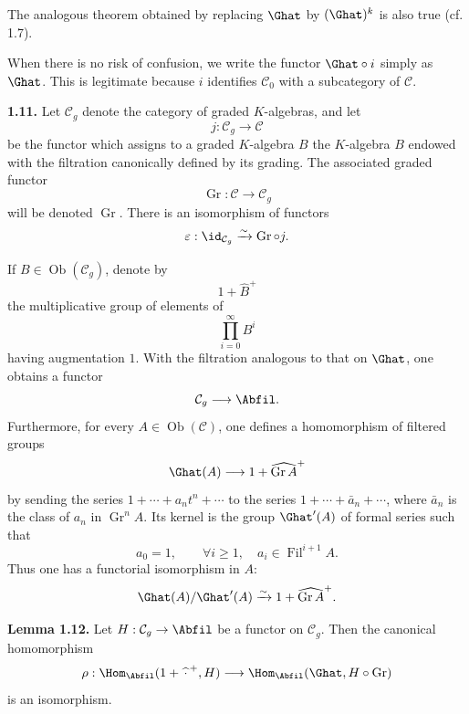 \documentclass[11pt]{article}
\newcommand{\Fil}{\operatorname{Fil}}
\begin{document}
The analogous theorem obtained by replacing \(\Ghat\) by \((\Ghat)^k\) is also true (cf. 1.7).

When there is no risk of confusion, we write the functor \(\Ghat\circ i\) simply as \(\Ghat\). This is legitimate because \(i\) identifies \(\mathcal C_0\) with a subcategory of \(\mathcal C\).

\textbf{1.11.} Let \(\mathcal C_g\) denote the category of graded \(K\)-algebras, and let
\[
  j:\mathcal C_g\longrightarrow\mathcal C
\]
be the functor which assigns to a graded \(K\)-algebra \(B\) the \(K\)-algebra \(B\) endowed with the filtration canonically defined by its grading. The associated graded functor
\[
  \operatorname{Gr}:\mathcal C\longrightarrow \mathcal C_g
\]
will be denoted \(\operatorname{Gr}\). There is an isomorphism of functors
\[
  \varepsilon:\id_{\mathcal C_g}\xrightarrow{\sim}\operatorname{Gr}\circ j.
\]

If \(B\in\operatorname{Ob}(\mathcal C_g)\), denote by
\[
  1+\widehat{B}^{+}
\]
the multiplicative group of elements of
\[
  \prod_{i=0}^{\infty}B^i
\]
having augmentation \(1\). With the filtration analogous to that on \(\Ghat\), one obtains a functor
\[
  \mathcal C_g\longrightarrow\Abfil.
\]
Furthermore, for every \(A\in\operatorname{Ob}(\mathcal C)\), one defines a homomorphism of filtered groups
\[
  \Ghat(A)\longrightarrow 1+\widehat{\operatorname{Gr}A}^{+}
\]
by sending the series \(1+\cdots+a_nt^n+\cdots\) to the series \(1+\cdots+\bar a_n+\cdots\), where \(\bar a_n\) is the class of \(a_n\) in \(\operatorname{Gr}^nA\). Its kernel is the group \(\Ghat'(A)\) of formal series such that
\[
  a_0=1,\qquad \forall i\geq 1,\quad a_i\in\Fil^{i+1}A.
\]
Thus one has a functorial isomorphism in \(A\):
\[
  \Ghat(A)/\Ghat'(A)\xrightarrow{\sim} 1+\widehat{\operatorname{Gr}A}^{+}.
\]

\textbf{Lemma 1.12.} Let \(H:\mathcal C_g\to\Abfil\) be a functor on \(\mathcal C_g\). Then the canonical homomorphism
\[
  \rho:\Hom_{\Abfil}(1+\widehat{\,\cdot\,}^{+},H)
  \longrightarrow
  \Hom_{\Abfil}(\Ghat,H\circ\operatorname{Gr})
\]
is an isomorphism.
\end{document}

